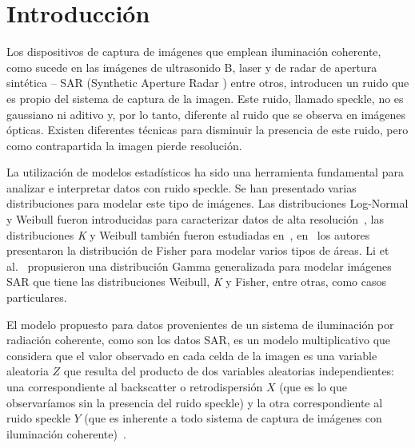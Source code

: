 
\chapter{Introducción}

Los dispositivos de captura de imágenes que emplean iluminación coherente, como sucede en las imágenes de ultrasonido B, laser y
de radar de apertura sintética – SAR (Synthetic Aperture Radar ) entre otros, introducen un ruido que es propio del sistema de captura de la imagen. Este ruido, llamado speckle, no es gaussiano ni aditivo y, por lo tanto, diferente al ruido que se observa en imágenes ópticas. Existen diferentes técnicas para disminuir la presencia de este ruido, pero como contrapartida la imagen pierde resolución.

La utilización de modelos estadísticos ha sido una herramienta fundamental para analizar e interpretar datos con ruido speckle. Se han presentado varias distribuciones para modelar este tipo de imágenes. Las distribuciones Log-Normal y Weibull fueron introducidas para caracterizar datos de alta resolución~\cite{oliverquegan98}, las distribuciones \textit{K} y Weibull también fueron estudiadas en~\cite{Oliver1993}, en~\cite{Tison2004} los autores presentaron la distribución de Fisher para modelar varios tipos de áreas. Li et al.~\cite{Li2011} propusieron una distribución Gamma generalizada para modelar imágenes SAR que tiene las distribuciones Weibull, \textit{K} y Fisher, entre otras, como casos particulares.

El modelo propuesto para datos provenientes de un sistema de iluminación por radiación coherente, como son los datos SAR, es un modelo multiplicativo que considera que el valor observado en cada celda de la imagen es una variable aleatoria $Z$ que resulta del producto de dos variables aleatorias independientes: una correspondiente al backscatter o retrodispersión $X$ (que es lo que observaríamos sin la presencia del ruido speckle) y la otra correspondiente al ruido speckle $Y$ (que es inherente a todo sistema de captura de imágenes con iluminación coherente)~\cite{oliverquegan98}. 

